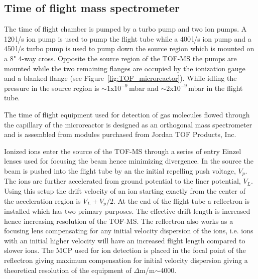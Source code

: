 \documentclass[aip,rsi]{revtex4-1}
\begin{document}
\subsection{Time of flight mass spectrometer}
The time of flight chamber is pumped by a turbo pump and two ion pumps. A 120\,l/s ion pump is used to pump the flight tube while a 400\,l/s ion pump and a 450\,l/s turbo pump is used to pump down the source region which is mounted on a 8" 4-way cross. Opposite the source region of the TOF-MS the pumps are mounted while the two remaining flanges are occupied by the ionization gauge and a blanked flange (see Figure~\ref{fig:TOF_microreactor}). While idling the pressure in the source region is $\sim1$x$10^{-9}$\,mbar and $\sim2$x$10^{-9}$\,mbar in the flight tube.

The time of flight equipment used for detection of gas molecules flowed through the capillary of the microreactor is designed as an orthogonal mass spectrometer and is assembled from modules purchased from Jordan TOF Products, Inc. 

Ionized ions enter the source of the TOF-MS through a series of entry Einzel lenses used for focusing the beam hence minimizing divergence. In the source the beam is pushed into the flight tube by an the initial repelling push voltage, $V_p$. The ions are further accelerated from ground potential to the liner potential, $V_L$. Using this setup the drift velocity of an ion starting exactly from the center of the acceleration region is $V_L + V_p/2$. At the end of the flight tube a reflectron is installed which has two primary purposes. The effective drift length is increased hence increasing resolution of the TOF-MS. The reflectron also works as a focusing lens compensating for any initial velocity dispersion of the ions, i.e. ions with an initial higher velocity will have an increased flight length compared to slower ions. The MCP used for ion detection is placed in the focal point of the reflectron giving maximum compensation for initial velocity dispersion giving a theoretical resolution of the equipment of $\Delta$m/m$\sim$4000.
\end{document}
